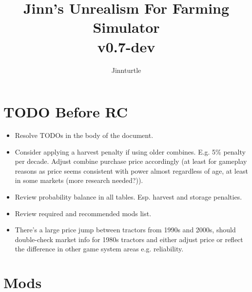 \documentclass[a4paper,10pt]{article}
\begin{document}
\newlength{\tabcolsepDefault}
\setlength{\tabcolsepDefault}{\tabcolsep}




\newcommand{\textbi}[1]{\textbf{\textit{#1}}}

\newcommand{\projName}{Jinn's Unrealism For Farming Simulator}
\newcommand{\projVersion}{v0.7-dev}

\newcommand{\refPageref}[1]{\ref{#1} (p. \pageref{#1})}


\title{\projName{}\\ \projVersion{}}
\author{Jinnturtle}

\maketitle
\tableofcontents


\section{TODO Before RC}
\begin{itemize}
\item Resolve TODOs in the body of the document.
\item Consider applying a harvest penalty if using older combines. E.g. 5\%
  penalty per decade. Adjust combine purchase price accordingly (at least for
  gameplay reasons as price seems consistent with power almost regardless of
  age, at least in some markets (more research needed?)).
\item Review probability balance in all tables. Esp. harvest and storage
  penalties.
\item Review required and recommended mods list.
\item There's a large price jump between tractors from 1990s and 2000s,
  should double-check market info for 1980s tractors and either adjust price or
  reflect the difference in other game system areas e.g. reliability.
\end{itemize}


\section{Mods}
\end{document}

